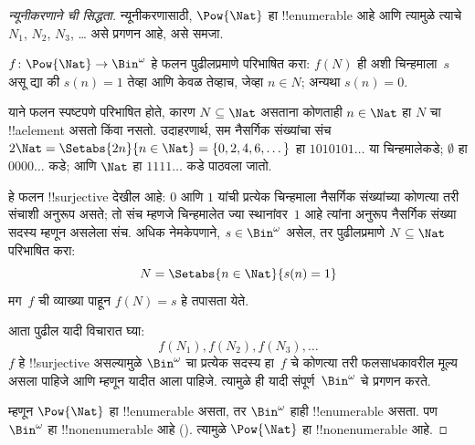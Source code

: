 \documentclass[../../../include/open-logic-section]{subfiles}
\begin{document}
\begin{proof}[न्यूनीकरणाने {} ची सिद्धता]
न्यूनीकरणासाठी, $\Pow{\Nat}$ हा !!{enumerable} आहे आणि त्यामुळे त्याचे
$N_{1}$, $N_{2}$, $N_{3}$, \dots{} असे प्रगणन आहे, असे समजा.

$f \colon \Pow{\Nat} \to \Bin^\omega$ हे फलन पुढीलप्रमाणे परिभाषित
करा: $f(N)$ ही अशी चिन्हमाला~$s$ असू द्या की $s(n) = 1$ तेव्हा आणि
केवळ तेव्हाच, जेव्हा $n \in N$; अन्यथा $s(n) = 0$.

याने फलन स्पष्टपणे परिभाषित होते, कारण $N \subseteq \Nat$ असताना
कोणताही $n \in \Nat$ हा $N$ चा !!a{element} असतो किंवा नसतो.
उदाहरणार्थ, सम नैसर्गिक संख्यांचा संच
$2\Nat = \Setabs{2n}{n \in \Nat} = \{0,2, 4, 6, \dots\}$ हा
$1010101\dots$ या चिन्हमालेकडे; $\emptyset$ हा $0000\dots$ कडे; आणि
$\Nat$ हा $1111\dots$ कडे पाठवला जातो.

हे फलन !!{surjective} देखील आहे: $0$ आणि $1$ यांची प्रत्येक चिन्हमाला
नैसर्गिक संख्यांच्या कोणत्या तरी संचाशी अनुरूप असते; तो संच म्हणजे
चिन्हमालेत ज्या स्थानांवर~$1$ आहे त्यांना अनुरूप नैसर्गिक संख्या
सदस्य म्हणून असलेला संच. अधिक नेमकेपणाने, $s \in \Bin^\omega$ असेल,
तर पुढीलप्रमाणे $N \subseteq \Nat$ परिभाषित करा:
\[
N = \Setabs{n \in \Nat}{s(n) = 1}
\]
मग~$f$ ची व्याख्या पाहून $f(N) = s$ हे तपासता येते.

आता पुढील यादी विचारात घ्या:
\[
f(N_1), f(N_2), f(N_3), \dots
\]
$f$ हे !!{surjective} असल्यामुळे $\Bin^\omega$ चा प्रत्येक सदस्य
हा~$f$ चे कोणत्या तरी फलसाधकावरील मूल्य असला पाहिजे आणि म्हणून यादीत
आला पाहिजे. त्यामुळे ही यादी संपूर्ण~$\Bin^\omega$ चे प्रगणन करते.

म्हणून $\Pow{\Nat}$ हा !!{enumerable} असता, तर $\Bin^\omega$ हाही
!!{enumerable} असता. पण $\Bin^\omega$ हा !!{nonenumerable} आहे
(). त्यामुळे $\Pow{\Nat}$ हा
!!{nonenumerable} आहे.
\end{proof}

\end{document}
